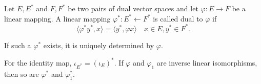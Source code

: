 Let $E, E^*$ and $F, F^*$ be two pairs of dual vector spaces and let $\varphi: E \to F$ be a linear mapping. A linear mapping $\varphi^*: E^* \leftarrow F^*$ is called dual to $\varphi$ if
$$\langle \varphi^* y^*, x \rangle = \langle y^*, \varphi x \rangle \quad x \in E, y^* \in F^*.$$

If such a $\varphi^*$ exists, it is uniquely determined by $\varphi$.

For the identity map, $\iota_{E^*} = (\iota_E)^*$. If $\varphi$ and $\varphi_1$ are inverse linear isomorphisms, then so are $\varphi^*$ and $\varphi_1^*$.

